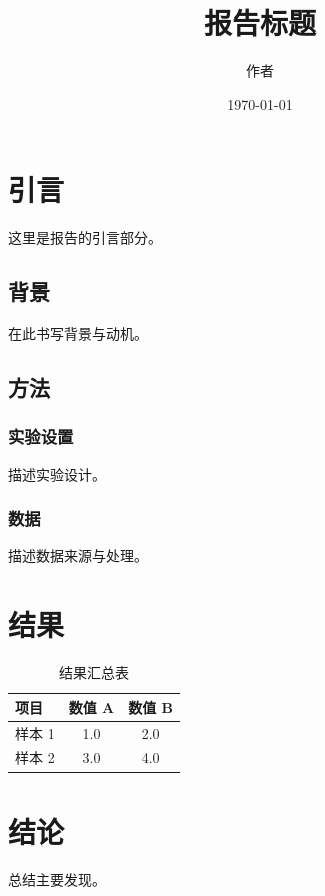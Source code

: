 \documentclass{ctexrep}
\title{报告标题}
\author{作者}
\date{\today}
\begin{document}
\maketitle

\tableofcontents

\chapter{引言}

这里是报告的引言部分。

\section{背景}

在此书写背景与动机。

\section{方法}

\subsection{实验设置}

描述实验设计。

\subsection{数据}

描述数据来源与处理。

\chapter{结果}

\begin{table}[h]
  \centering
  \begin{tabular}{lcc}
    \hline
    项目 & 数值 A & 数值 B \\
    \hline
    样本 1 & 1.0 & 2.0 \\
    样本 2 & 3.0 & 4.0 \\
    \hline
  \end{tabular}
  \caption{结果汇总表}
\end{table}

\chapter{结论}

总结主要发现。
\end{document}
